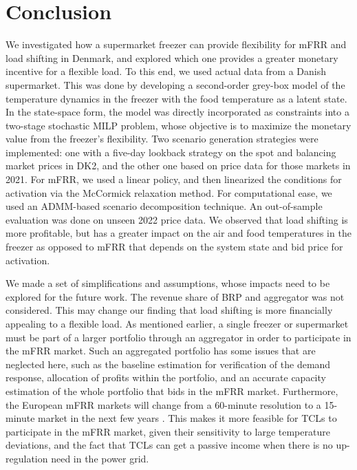 \vspace{-2mm}
\section{Conclusion}\label{sec:conclusion}
%
We investigated how a supermarket freezer can provide flexibility for mFRR and load shifting in Denmark, and explored which one provides a greater monetary incentive for a flexible load. To this end, we used actual data  from a Danish supermarket. This was done by developing a second-order grey-box model of the temperature dynamics in the freezer with the food temperature as a latent state. In the state-space form, the model was directly incorporated as constraints into a two-stage stochastic MILP problem, whose objective is to maximize the monetary value from the freezer's flexibility. Two scenario generation strategies were implemented: one with a five-day lookback strategy on the spot and balancing market prices in DK2, and the other one  based on price data for those markets in 2021. For mFRR, we used a linear policy, and then linearized the conditions for activation via the McCormick relaxation method. For computational ease, we used an ADMM-based scenario decomposition technique.  An out-of-sample evaluation was done on unseen 2022 price data. We observed that load shifting is more profitable, but has a greater impact on the air and food temperatures in the freezer as opposed to mFRR that depends on the system state and bid price for activation.

We made a set of simplifications and assumptions, whose impacts need to be explored for the future work. The revenue share of BRP and aggregator was not considered. This may change our finding that load shifting is more financially appealing to a flexible load. As mentioned earlier, a single freezer or supermarket must be part of a larger portfolio through an aggregator in order to participate in the mFRR market. Such an aggregated portfolio has some issues that are neglected here, such as the baseline estimation for verification of the demand response, allocation of profits within the portfolio, and an accurate capacity estimation of the whole portfolio that bids in the mFRR market. Furthermore, the European mFRR markets will change from a 60-minute resolution to a 15-minute market in the next few years \cite{MARI}. This makes it more feasible for TCLs to participate in the mFRR market, given their sensitivity to large temperature deviations, and the fact that TCLs can get a passive income when there is no up-regulation need in the power grid.